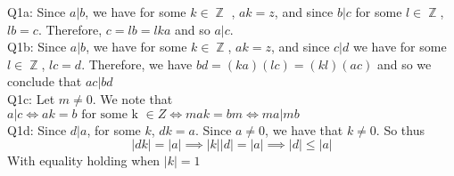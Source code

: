 \documentclass[letterpaper]{article}
\DeclareMathOperator{\Z}{\mathbb{Z}}
\begin{document}
\noindent Q1a: Since $a|b$, we have for some $k\in \Z$ , $ak=z$, and since $b|c$ for some $l\in \Z$, $lb=c$. Therefore, $c = lb = lka$ and so $a|c$. 
\newline \\ Q1b: Since $a|b$, we have for some $k\in \Z$, $ak=z$, and since $c|d$ we have for some $l\in \Z$, $lc = d$. Therefore, we have $bd = (ka)(lc) = (kl)(ac) $ and so we conclude that $ ac|bd$
\newline \\ Q1c: Let $m\neq 0 $. We note that $a|c \iff ak=b \text{ for some k }\in Z \iff mak = bm \iff ma|mb$
\newline \\ Q1d: Since $d|a$, for some $k$, $dk = a$. Since $a\neq 0$, we have that $k\neq 0$. So thus $$|dk|=|a| \implies |k||d| = |a| \implies |d|\leq |a|$$ With equality holding when $|k|=1$
\end{document}
